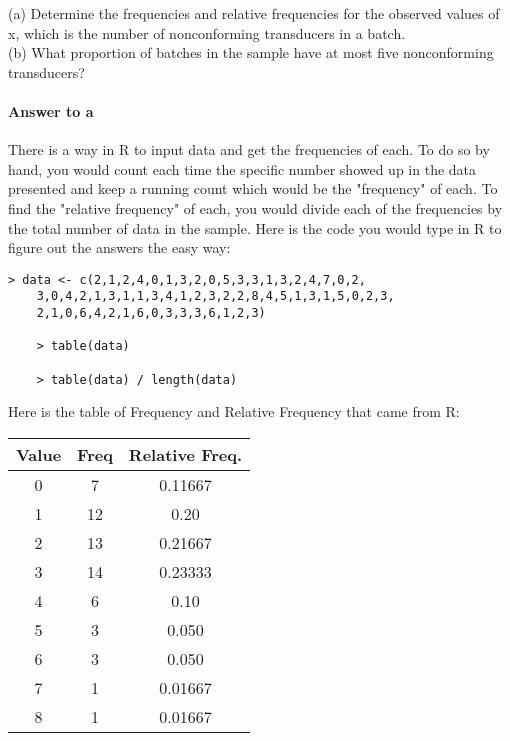 \documentclass{article}
\begin{document}
	\noindent (a) Determine the frequencies and relative frequencies for the observed values of x, 
	which is the number of nonconforming transducers in a batch. \\
	\noindent (b) What proportion of batches in the sample have at most five nonconforming 
	transducers?
	
	\paragraph{Answer to a} 
	There is a way in R to input data and get the frequencies of each. To do so by hand, you would 
	count each time the specific number showed up in the data presented and keep a running count 
	which would be the "frequency" of each. To find the "relative frequency" of each, you would 
	divide each of the frequencies by the total number of data in the sample. Here is the code you 
	would type in R to figure out the answers the easy way:
	
	\begin{lstlisting}[frame=single]
    > data <- c(2,1,2,4,0,1,3,2,0,5,3,3,1,3,2,4,7,0,2,
    3,0,4,2,1,3,1,1,3,4,1,2,3,2,2,8,4,5,1,3,1,5,0,2,3,
    2,1,0,6,4,2,1,6,0,3,3,3,6,1,2,3)

    > table(data)

    > table(data) / length(data)
	\end{lstlisting} 
	
	\noindent Here is the table of Frequency and Relative Frequency that came from R: 

	\begin{table}[!htb]
	\centering
	\begin{tabular}{ | c | c | c | }
		\hline
		\textbf{Value} & \textbf{Freq} & \textbf{Relative Freq.} \\ \hline \hline
		0 & 7 & 0.11667 \\ \hline
		1 & 12 & 0.20 \\ \hline
		2 & 13 & 0.21667 \\ \hline
		3 & 14 & 0.23333 \\ \hline
		4 & 6 & 0.10 \\ \hline
		5 & 3 & 0.050 \\ \hline
		6 & 3 & 0.050 \\ \hline
		7 & 1 & 0.01667 \\ \hline
		8 & 1 & 0.01667 \\ \hline
	\end{tabular}
	\label{tab:frequency_table}
	\end{table}
	\vspace{-1.0\baselineskip}
	
\end{document}
